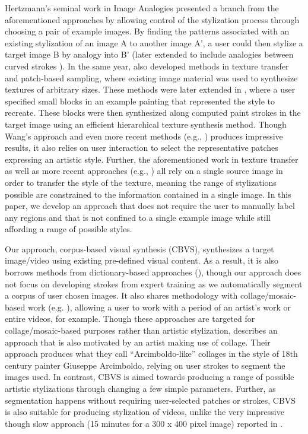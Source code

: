 \documentclass[a4paper,10pt,final]{ThesisStyle}
\begin{document}
Hertzmann's seminal work in Image Analogies \cite{Hertzmann2001} presented a branch from the aforementioned approaches by allowing control of the stylization process through choosing a pair of example images.  By finding the patterns associated with an existing stylization of an image A to another image A', a user could then stylize a target image B by analogy into B' (later extended to include analogies between curved strokes \cite{Hertzmann2002}).  In the same year, \cite{Efros2001,Liang2001a} also developed methods in texture transfer and patch-based sampling, where existing image material was used to synthesize textures of arbitrary sizes.  These methods were later extended in \cite{Wang2004a}, where a user specified small blocks in an example painting that represented the style to recreate.  These blocks were then synthesized along computed paint strokes in the target image using an efficient hierarchical texture synthesis method.  Though Wang's approach and even more recent methods (e.g., \cite{Guo2006}) produces impressive results, it also relies on user interaction to select the representative patches expressing an artistic style.  Further, the aforementioned work in texture transfer as well as more recent approaches (e.g., \cite{Lee2010}) all rely on a single source image in order to transfer the style of the texture, meaning the range of stylizations possible are constrained to the information contained in a single image.  In this paper, we develop an approach that does not require the user to manually label any regions and that is not confined to a single example image while still affording a range of possible styles.  

Our approach, corpus-based visual synthesis (CBVS), synthesizes a target image/video using existing pre-defined visual content.  As a result, it is also borrows methods from dictionary-based approaches (\cite{Zeng2009,Healey2004}), though our approach does not focus on developing strokes from expert training as we automatically segment a corpus of user chosen images.  It also shares methodology with collage/mosaic-based work (e.g. \cite{Kim2002,Orchard2008,Huang2011a,Miller2012}), allowing a user to work with a period of an artist's work or entire videos, for example.  Though these approaches are targeted for collage/mosaic-based purposes rather than artistic stylization, \cite{Huang2011a} describes an approach that is also motivated by an artist making use of collage.  Their approach produces what they call ``Arcimboldo-like'' collages in the style of 18th century painter Giuseppe Arcimboldo, relying on user strokes to segment the images used.  In contrast, CBVS is aimed towards producing a range of possible artistic stylizations through changing a few simple parameters.  Further, as segmentation happens without requiring user-selected patches or strokes, CBVS is also suitable for producing stylization of videos, unlike the very impressive though slow approach (15 minutes for a 300 x 400 pixel image) reported in \cite{Chang2010}.
\end{document}
